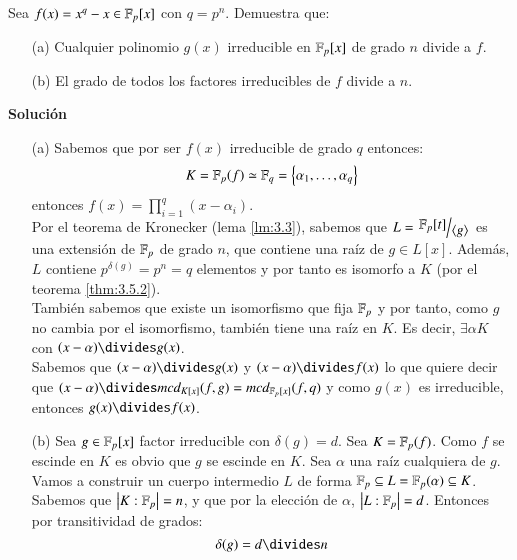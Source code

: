 \begin{ex}[H3.18]
    Sea $f(x) = x^q - x \in \mathbb{F}_p[x]$ con $q = p^n$. Demuestra que:
    \begin{itemize}
        \item[(a)] Cualquier polinomio $g(x)$ irreducible en $\mathbb{F}_p[x]$ de grado $n$ divide a $f$.
        \item[(b)] El grado de todos los factores irreducibles de $f$ divide a $n$.
    \end{itemize}
    \textbf{Solución}\\
    \begin{itemize}
        \item[(a)] Sabemos que por ser $f(x)$ irreducible de grado $q$ entonces:
        $$
            K = \mathbb{F}_p(f) \simeq \mathbb{F}_q = \left\{\alpha_1, \ldots, \alpha_q\right\}
        $$
        entonces $f(x) = \prod_{i=1}^{q} (x-\alpha_i)$.\\
        Por el teorema de Kronecker (lema \ref{lm:3.3}), sabemos que $L = \quo{\F_p[t]}{\gen{g}}$ es una extensión de $\mathbb{F}_p$ de grado $n$, que contiene una raíz de $g \in L[x]$. Además, $L$ contiene $p^{\delta(g)} = p^n = q$ elementos y por tanto es isomorfo a $K$ (por el teorema \ref{thm:3.5.2}).\\
        También sabemos que existe un isomorfismo que fija $\mathbb{F}_p$ y por tanto, como $g$ no cambia por el isomorfismo, también tiene una raíz en $K$.
        Es decir, $\exists \alpha K$ con $(x - \alpha) \divides g(x)$.\\
        Sabemos que $(x-\alpha)\divides g(x)$ y $(x-\alpha)\divides f(x)$ lo que quiere decir que $(x-\alpha)\divides mcd_{K[x]}(f, g) = mcd_{\F_p[x]}(f, q)$ y como $g(x)$ es irreducible, entonces $g(x) \divides f(x)$.
        \item[(b)]
        Sea $g \in \mathbb{F}_p[x]$ factor irreducible con $\delta(g) = d$. Sea $K = \mathbb{F}_p(f)$. Como $f$ se escinde en $K$ es obvio que $g$ se escinde en $K$. Sea $\alpha$ una raíz cualquiera de $g$. Vamos a construir un cuerpo intermedio $L$ de forma $\mathbb{F}_p \subseteq L = \mathbb{F}_p(\alpha) \subseteq K$. Sabemos que $\left|K:\mathbb{F}_p\right| = n$, y que por la elección de $\alpha$, $\left|L:\mathbb{F}_p\right| = d$. Entonces por transitividad de grados:
        $$
            \delta(g) = d \divides n
        $$
    \end{itemize}
\end{ex}
